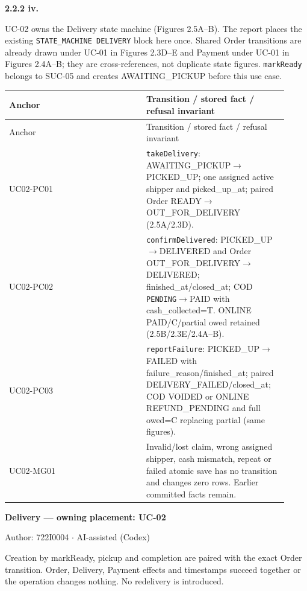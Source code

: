 \textbf{2.2.2 iv.}\par
UC-02 owns the Delivery state machine (Figures 2.5A--B). The report places the existing \texttt{STATE\_\allowbreak{}MACHINE DELIVERY} block here once. Shared Order transitions are already drawn under UC-01 in Figures 2.3D--E and Payment under UC-01 in Figures 2.4A--B; they are cross-references, not duplicate state figures. \texttt{markReady} belongs to SUC-05 and creates AWAITING\_PICKUP before this use case.

\begin{longtable}{>{\raggedright\arraybackslash}p{0.4600\linewidth}>{\raggedright\arraybackslash}p{0.4600\linewidth}}
Anchor & Transition / stored fact / refusal invariant \\
\hline\endfirsthead
Anchor & Transition / stored fact / refusal invariant \\
\hline\endhead
UC02-PC01 & \texttt{takeDelivery}: AWAITING\_PICKUP\ensuremath{\rightarrow}PICKED\_UP; one assigned active shipper and picked\_up\_at; paired Order READY\ensuremath{\rightarrow}OUT\_FOR\_DELIVERY (2.5A/2.3D). \\
UC02-PC02 & \texttt{confirmDelivered}: PICKED\_UP\ensuremath{\rightarrow}DELIVERED and Order OUT\_FOR\_DELIVERY\ensuremath{\rightarrow}DELIVERED; finished\_at/closed\_at; COD \texttt{PENDING}\ensuremath{\rightarrow}PAID with cash\_collected=T. ONLINE PAID/C/partial owed retained (2.5B/2.3E/2.4A--B). \\
UC02-PC03 & \texttt{reportFailure}: PICKED\_UP\ensuremath{\rightarrow}FAILED with failure\_reason/finished\_at; paired DELIVERY\_FAILED/closed\_at; COD VOIDED or ONLINE REFUND\_PENDING and full owed=C replacing partial (same figures). \\
UC02-MG01 & Invalid/lost claim, wrong assigned shipper, cash mismatch, repeat or failed atomic save has no transition and changes zero rows. Earlier committed facts remain. \\
\end{longtable}
\textbf{Delivery --- owning placement: UC-02}

Author: 722I0004 \ensuremath{\cdot} AI-assisted (Codex)

Creation by markReady, pickup and completion are paired with the exact Order transition. Order, Delivery, Payment effects and timestamps succeed together or the operation changes nothing. No redelivery is introduced.

